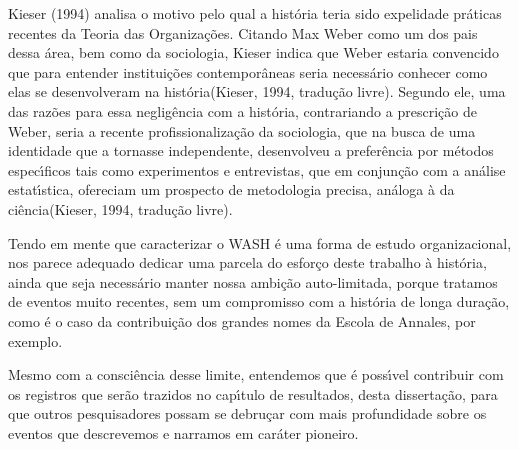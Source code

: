 \documentclass[
12pt,		%
openright,	%
twoside,  %
a4paper,			%
chapter=TITLE,		%
english,			%
french,				%
spanish,			%
brazil				%
]{USPSC-classe/USPSC}
\begin{document}
Kieser (1994)  analisa o motivo pelo qual a hist\'oria teria sido \textquotedbl expelida\textquotedbl  de pr\'aticas recentes da Teoria das Organiza\c{c}\~oes. Citando Max Weber como um dos pais dessa \'area, bem como da sociologia, Kieser indica que Weber estaria \textquotedbl convencido que para entender institui\c{c}\~oes contempor\^aneas seria necess\'ario conhecer como elas se desenvolveram na hist\'oria\textquotedbl   (Kieser, 1994, tradu\c{c}\~ao livre). Segundo ele, uma das raz\~oes para essa neglig\^encia com a hist\'oria, contrariando a prescri\c{c}\~ao de Weber, seria a recente profissionaliza\c{c}\~ao da sociologia, que na busca de uma identidade que a tornasse independente, desenvolveu a prefer\^encia por m\'etodos espec\'{\i}ficos tais como experimentos e entrevistas, que \textquotedbl em conjun\c{c}\~ao com a an\'alise estat\'{\i}stica, ofereciam um prospecto de metodologia precisa, an\'aloga \`a da ci\^encia\textquotedbl   (Kieser, 1994, tradu\c{c}\~ao livre).

















Tendo em mente que caracterizar o WASH \'e uma forma de estudo organizacional, nos parece adequado dedicar uma parcela do esfor\c{c}o deste trabalho \`a hist\'oria, ainda que seja necess\'ario manter nossa ambi\c{c}\~ao auto-limitada, porque tratamos de eventos muito recentes, sem um compromisso com a hist\'oria de longa dura\c{c}\~ao, como \'e o caso da contribui\c{c}\~ao dos grandes nomes da Escola de Annales, por exemplo.

















Mesmo com a consci\^encia desse limite, entendemos que \'e poss\'{\i}vel contribuir com os registros que ser\~ao trazidos no cap\'{\i}tulo de resultados, desta disserta\c{c}\~ao, para que outros pesquisadores possam se debru\c{c}ar com mais profundidade sobre os eventos que descrevemos e narramos em car\'ater pioneiro.
\end{document}
